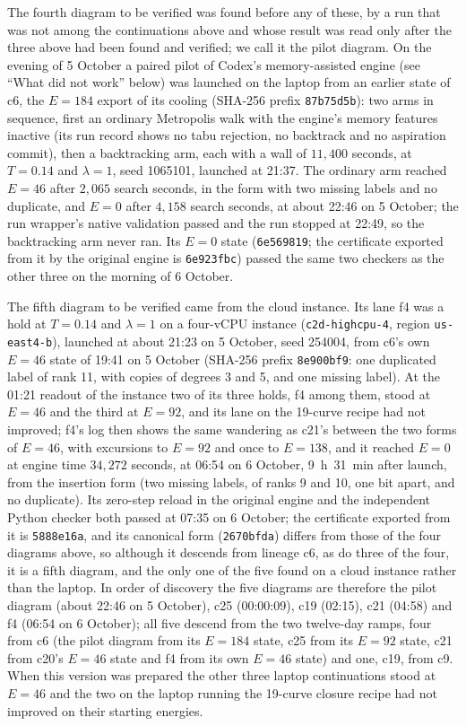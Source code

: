 \documentclass[11pt]{article}
\begin{document}
The fourth diagram to be verified was found before any of these, by a run that was not among the continuations above
and whose result was read only after the three above had been found and verified; we call it the pilot diagram. On
the evening of 5 October a paired pilot
of Codex's memory-assisted engine (see ``What did not work'' below) was launched on the laptop from an
earlier state of c6, the $E=184$ export of its cooling (SHA-256 prefix \texttt{87b75d5b}): two arms in sequence,
first an ordinary Metropolis walk with the engine's memory features inactive (its run record shows no tabu rejection,
no backtrack and no aspiration commit), then a backtracking arm, each with a wall of $11{,}400$ seconds, at
$T=0.14$ and $\lambda=1$, seed 1065101, launched at 21:37. The ordinary arm reached $E=46$ after $2{,}065$
search seconds, in the form with two missing labels and no duplicate, and $E=0$ after $4{,}158$ search seconds, at
about 22:46 on 5 October; the run wrapper's native validation passed and the run stopped at 22:49, so the
backtracking arm never ran. Its $E=0$ state (\texttt{6e569819}; the certificate exported from it by the original
engine is \texttt{6e923fbc}) passed the same two checkers as the other three on the morning of 6 October.

The fifth diagram to be verified came from the cloud instance. Its lane f4 was a hold at $T=0.14$ and $\lambda=1$ on a four-vCPU
instance (\texttt{c2d-highcpu-4}, region \texttt{us-east4-b}), launched at about 21:23 on 5 October, seed 254004, from
c6's own $E=46$ state of 19:41 on 5 October (SHA-256 prefix \texttt{8e900bf9}: one duplicated label of rank 11, with
copies of degrees 3 and 5, and one missing label). At the 01:21 readout of the instance two of its three holds, f4
among them, stood at $E=46$ and the third at $E=92$, and its lane on the 19-curve recipe had not improved; f4's log then
shows the same wandering as c21's between the two forms of $E=46$, with excursions to $E=92$ and once to $E=138$, and
it reached $E=0$ at engine time $34{,}272$ seconds, at 06:54 on 6 October, 9~h~31~min after launch, from the insertion
form (two missing labels, of ranks 9 and 10, one bit apart, and no duplicate). Its zero-step reload in the original
engine and the independent Python checker both passed at 07:35 on 6 October; the certificate exported from it is
\texttt{5888e16a}, and its canonical form (\texttt{2670bfda}) differs from those of the four diagrams above, so
although it descends from lineage c6, as do three of the four, it is a fifth diagram, and the only one of the five
found on a cloud instance rather than the laptop. In order of
discovery the five diagrams are therefore the pilot diagram (about 22:46 on 5 October), c25 (00:00:09), c19 (02:15),
c21 (04:58) and f4 (06:54 on 6 October); all five descend from the two twelve-day ramps, four from c6 (the pilot
diagram from its $E=184$ state, c25 from its $E=92$ state, c21 from c20's $E=46$ state and f4 from its own $E=46$
state) and one, c19, from c9.
When this version was prepared the other three laptop continuations stood at $E=46$ and the two on the laptop running
the 19-curve closure recipe had not improved on their starting energies.
\end{document}
